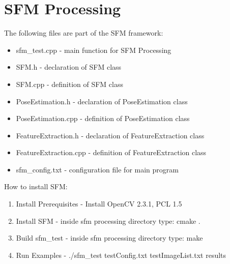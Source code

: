 \documentclass[12pt]{article}
\begin{document}
\section{SFM Processing}
The following files are part of the SFM framework:
\begin{itemize}
	\item{sfm\_test.cpp} - main function for SFM Processing
	\item{SFM.h} - declaration of SFM class
	\item{SFM.cpp} - definition of SFM class
	\item{PoseEstimation.h} - declaration of PoseEstimation class
	\item{PoseEstimation.cpp} - definition of PoseEstimation class
	\item{FeatureExtraction.h} - declaration of FeatureExtraction class
	\item{FeatureExtraction.cpp} - definition of FeatureExtraction class
	\item{sfm\_config.txt} - configuration file for main program
\end{itemize}


\noindent How to install SFM:
\begin{enumerate}
	\item{Install Prerequisites} - Install OpenCV 2.3.1, PCL 1.5
	\item{Install SFM} - inside sfm processing directory type: cmake .
	\item{Build sfm\_test} - inside sfm processing directory type: make
	\item{Run Examples} - ./sfm\_test testConfig.txt testImageList.txt results
\end{enumerate}
\end{document}
